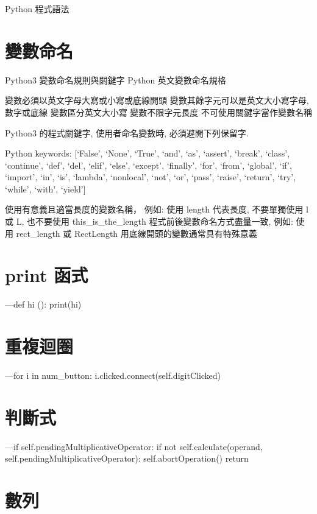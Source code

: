 \documentclass[12pt,,]{report}
\begin{document}
Python 程式語法

\hypertarget{ux8b8aux6578ux547dux540d}{%
\section{變數命名}\label{ux8b8aux6578ux547dux540d}}

Python3 變數命名規則與關鍵字 Python 英文變數命名規格

變數必須以英文字母大寫或小寫或底線開頭 變數其餘字元可以是英文大小寫字母,
數字或底線 變數區分英文大小寫 變數不限字元長度
不可使用關鍵字當作變數名稱

Python3 的程式關鍵字, 使用者命名變數時, 必須避開下列保留字.

Python keywords: {[}`False', `None', `True', `and', `as', `assert',
`break', `class', `continue', `def', `del', `elif', `else', `except',
`finally', `for', `from', `global', `if', `import', `in', `is',
`lambda', `nonlocal', `not', `or', `pass', `raise', `return', `try',
`while', `with', `yield'{]}

使用有意義且適當長度的變數名稱， 例如: 使用 length 代表長度,
不要單獨使用 l 或 L, 也不要使用 this\_is\_the\_length
程式前後變數命名方式盡量一致, 例如: 使用 rect\_length 或 RectLength
用底線開頭的變數通常具有特殊意義

\hypertarget{print-ux51fdux5f0f}{%
\section{print 函式}\label{print-ux51fdux5f0f}}

---def hi (): print(hi)

\hypertarget{ux91cdux8907ux8ff4ux5708}{%
\section{重複迴圈}\label{ux91cdux8907ux8ff4ux5708}}

---for i in num\_button: i.clicked.connect(self.digitClicked)

\hypertarget{ux5224ux65b7ux5f0f}{%
\section{判斷式}\label{ux5224ux65b7ux5f0f}}

---if self.pendingMultiplicativeOperator: if not self.calculate(operand,
self.pendingMultiplicativeOperator): self.abortOperation() return

\hypertarget{ux6578ux5217}{%
\section{數列}\label{ux6578ux5217}}
\end{document}
